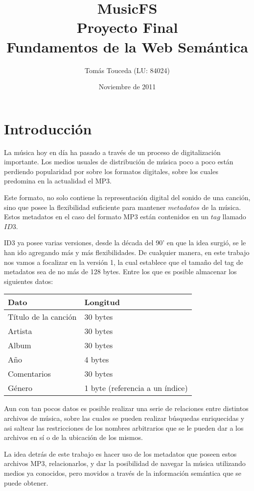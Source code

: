 \documentclass[a4paper,oneside]{report}
\title{MusicFS\\Proyecto Final\\Fundamentos de la Web Semántica}
\author{Tomás Touceda (LU: 84024)}
\date{Noviembre de 2011}
\begin{document}
\maketitle
\tableofcontents

\chapter{Introducción}

La música hoy en día ha pasado a través de un proceso de digitalización importante. Los medios usuales de distribución de música poco a poco están perdiendo popularidad por sobre los formatos digitales, sobre los cuales predomina en la actualidad el MP3.

Este formato, no solo contiene la representación digital del sonido de una canción, sino que posee la flexibilidad suficiente para mantener $metadatos$ de la música. Estos metadatos en el caso del formato MP3 están contenidos en un $tag$ llamado $ID3$.

ID3 ya posee varias versiones, desde la década del 90' en que la idea surgió, se le han ido agregando más y más flexibilidades. De cualquier manera, en este trabajo nos vamos a focalizar en la versión 1, la cual establece que el tamaño del tag de metadatos sea de no más de 128 bytes. Entre los que es posible almacenar los siguientes datos:

\begin{center}
\begin{tabular}{ | l | l | }
  \hline
  Dato & Longitud \\ \hline
  Título de la canción & 30 bytes \\ \hline
  Artista & 30 bytes \\ \hline
  Album & 30 bytes \\ \hline
  Año & 4 bytes \\ \hline
  Comentarios & 30 bytes \\ \hline
  Género & 1 byte (referencia a un índice) \\ \hline
\end{tabular}
\end{center}


Aun con tan pocos datos es posible realizar una serie de relaciones entre distintos archivos de música, sobre las cuales se pueden realizar búsquedas enriquecidas y asi saltear las restricciones de los nombres arbitrarios que se le pueden dar a los archivos en sí o de la ubicación de los mismos.

La idea detrás de este trabajo es hacer uso de los metadatos que poseen estos archivos MP3, relacionarlos, y dar la posibilidad de navegar la música utilizando medios ya conocidos, pero movidos a través de la información semántica que se puede obtener.
\end{document}
